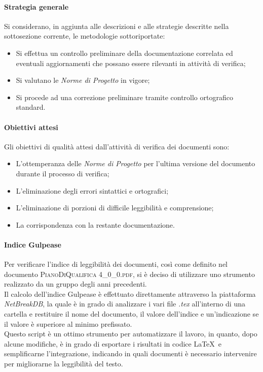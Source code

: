 		\paragraph{Strategia generale}
		Si considerano, in aggiunta alle descrizioni e alle strategie descritte nella sottosezione corrente, le metodologie sottoriportate:
		
		\begin{itemize}
			\item Si effettua un controllo preliminare della documentazione correlata ed eventuali aggiornamenti che possano essere rilevanti in attività di verifica;
			\item Si valutano le \textit{Norme di Progetto} in vigore;
			\item Si procede ad una correzione preliminare tramite controllo ortografico standard.
		\end{itemize}
	
		\paragraph{Obiettivi attesi}
		Gli obiettivi di qualità attesi dall'attività di verifica dei documenti sono:
		
		\begin{itemize}
			\item L'ottemperanza delle \textit{Norme di Progetto} per l'ultima versione del documento durante il processo di verifica;
			\item L'eliminazione degli errori sintattici e ortografici;
			\item L'eliminazione di porzioni di difficile leggibilità e comprensione;
			\item La corrispondenza con la restante documentazione.
		\end{itemize}
				
		\paragraph{Indice Gulpease}
		Per verificare l'indice di leggibilità dei documenti, così come definito nel documento \textsc{PianoDiQualifica 4\_0\_0.pdf}, si è deciso di utilizzare uno strumento realizzato da un gruppo degli anni precedenti.\\
		Il calcolo dell'indice Gulpease è effettuato direttamente attraverso la piattaforma \textit{NetBreakDB}, la quale è in grado di analizzare i vari file \textit{.tex} all'interno di una cartella e restituire il nome del documento, il valore dell'indice e un'indicazione se il valore è superiore al minimo prefissato.\\
		Questo script è un ottimo strumento per automatizzare il lavoro, in quanto, dopo alcune modifiche, è in grado di esportare i risultati in codice \LaTeX\ e semplificarne l'integrazione, indicando in quali documenti è necessario intervenire per migliorarne la leggibilità del testo.
		
